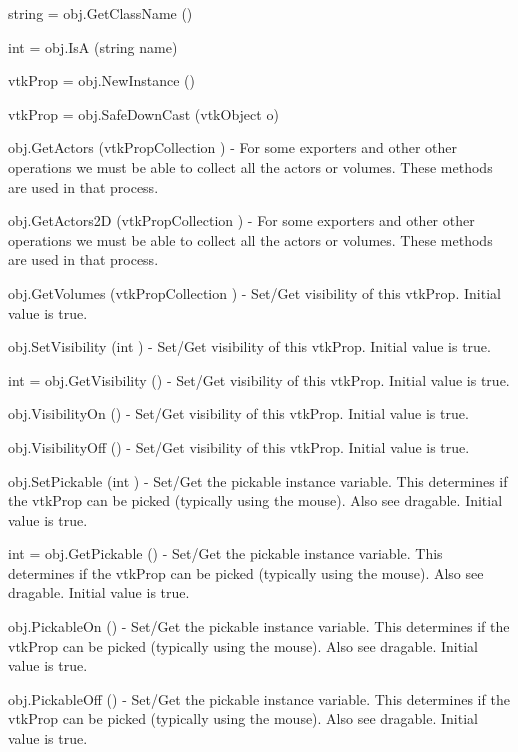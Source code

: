 \begin{DoxyItemize}
\item {\ttfamily string = obj.\-Get\-Class\-Name ()}  
\item {\ttfamily int = obj.\-Is\-A (string name)}  
\item {\ttfamily vtk\-Prop = obj.\-New\-Instance ()}  
\item {\ttfamily vtk\-Prop = obj.\-Safe\-Down\-Cast (vtk\-Object o)}  
\item {\ttfamily obj.\-Get\-Actors (vtk\-Prop\-Collection )} -\/ For some exporters and other other operations we must be able to collect all the actors or volumes. These methods are used in that process.  
\item {\ttfamily obj.\-Get\-Actors2\-D (vtk\-Prop\-Collection )} -\/ For some exporters and other other operations we must be able to collect all the actors or volumes. These methods are used in that process.  
\item {\ttfamily obj.\-Get\-Volumes (vtk\-Prop\-Collection )} -\/ Set/\-Get visibility of this vtk\-Prop. Initial value is true.  
\item {\ttfamily obj.\-Set\-Visibility (int )} -\/ Set/\-Get visibility of this vtk\-Prop. Initial value is true.  
\item {\ttfamily int = obj.\-Get\-Visibility ()} -\/ Set/\-Get visibility of this vtk\-Prop. Initial value is true.  
\item {\ttfamily obj.\-Visibility\-On ()} -\/ Set/\-Get visibility of this vtk\-Prop. Initial value is true.  
\item {\ttfamily obj.\-Visibility\-Off ()} -\/ Set/\-Get visibility of this vtk\-Prop. Initial value is true.  
\item {\ttfamily obj.\-Set\-Pickable (int )} -\/ Set/\-Get the pickable instance variable. This determines if the vtk\-Prop can be picked (typically using the mouse). Also see dragable. Initial value is true.  
\item {\ttfamily int = obj.\-Get\-Pickable ()} -\/ Set/\-Get the pickable instance variable. This determines if the vtk\-Prop can be picked (typically using the mouse). Also see dragable. Initial value is true.  
\item {\ttfamily obj.\-Pickable\-On ()} -\/ Set/\-Get the pickable instance variable. This determines if the vtk\-Prop can be picked (typically using the mouse). Also see dragable. Initial value is true.  
\item {\ttfamily obj.\-Pickable\-Off ()} -\/ Set/\-Get the pickable instance variable. This determines if the vtk\-Prop can be picked (typically using the mouse). Also see dragable. Initial value is true.  

\end{DoxyItemize}
